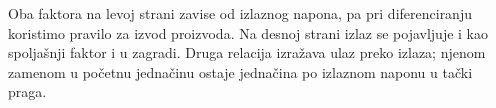 Oba faktora na levoj strani zavise od izlaznog napona, pa pri diferenciranju koristimo pravilo za izvod proizvoda. Na desnoj strani izlaz se pojavljuje i kao spoljašnji faktor i u zagradi. Druga relacija izražava ulaz preko izlaza; njenom zamenom u početnu jednačinu ostaje jednačina po izlaznom naponu u tački praga.
